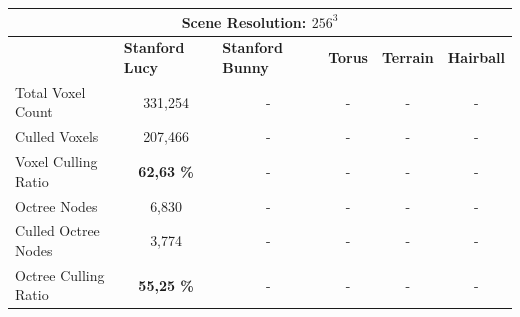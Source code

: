 \begin{table}[h]
    \begin{tabular}{|lccccc|}
    \hline
    \multicolumn{6}{|c|}{\textbf{Scene Resolution: $256^3$}}                                                                                                                                                                                                         \\ \hline
    \multicolumn{1}{|l|}{}                          & \multicolumn{1}{|l|}{\textbf{Stanford Lucy}}  & \multicolumn{1}{l|}{\textbf{Stanford Bunny}}  & \multicolumn{1}{l|}{\textbf{Torus}}   & \multicolumn{1}{l|}{\textbf{Terrain}}     & \multicolumn{1}{l|}{\textbf{Hairball}}    \\ \hline
    \multicolumn{1}{|l|}{Total Voxel Count}         & \multicolumn{1}{c|}{331,254}                  & \multicolumn{1}{c|}{-}                        & \multicolumn{1}{c|}{-}                & \multicolumn{1}{c|}{-}                    & \multicolumn{1}{c|}{-}                    \\
    \multicolumn{1}{|l|}{Culled Voxels}             & \multicolumn{1}{c|}{207,466}                  & \multicolumn{1}{c|}{-}                        & \multicolumn{1}{c|}{-}                & \multicolumn{1}{c|}{-}                    & -                                         \\
    \multicolumn{1}{|l|}{Voxel Culling Ratio}       & \multicolumn{1}{c|}{\textbf{62,63 \%}}        & \multicolumn{1}{c|}{-}                        & \multicolumn{1}{c|}{-}                & \multicolumn{1}{c|}{-}                    & -                                         \\ \hline
    \multicolumn{1}{|l|}{Octree Nodes}              & \multicolumn{1}{c|}{6,830}                    & \multicolumn{1}{c|}{-}                        & \multicolumn{1}{c|}{-}                & \multicolumn{1}{c|}{-}                    & -                                         \\
    \multicolumn{1}{|l|}{Culled Octree Nodes}       & \multicolumn{1}{c|}{3,774}                    & \multicolumn{1}{c|}{-}                        & \multicolumn{1}{c|}{-}                & \multicolumn{1}{c|}{-}                    & -                                         \\
    \multicolumn{1}{|l|}{Octree Culling Ratio}      & \multicolumn{1}{c|}{\textbf{55,25 \%}}        & \multicolumn{1}{c|}{-}                        & \multicolumn{1}{c|}{-}                & \multicolumn{1}{c|}{-}                    & -                                         \\ \hline
    \end{tabular}
\end{table}


